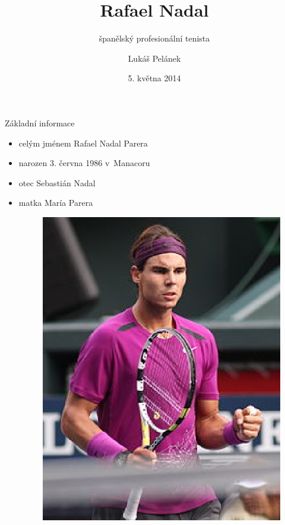 \documentclass[pdf,slideColor,azure]{prosper}
\begin{document}
\title{Rafael Nadal}
\subtitle{španělský profesionální tenista}
\author{Lukáš Pelánek}
\date{5. května 2014}
\maketitle

\begin{slide}{Základní informace}	
\begin{itemize}
\item celým jménem Rafael Nadal Parera
\item narozen 3. června 1986 v~Manacoru
\item otec Sebastián Nadal
\item matka María Parera
\begin{figure}
\centering
\includegraphics[scale=0.5]{obr1.eps}
\end{figure}
\end{itemize}
\end{slide}
\end{document}
